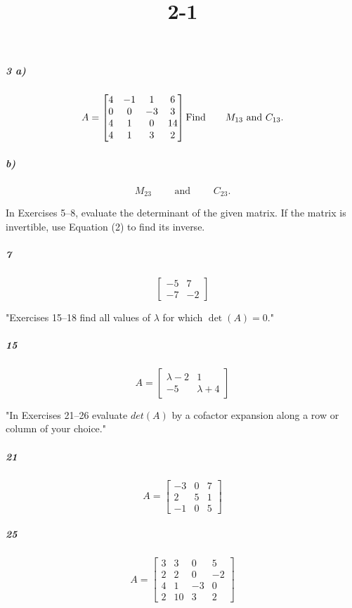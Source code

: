 \documentclass[fleqn]{article}
\title{2-1}
\begin{document}
\maketitle
\pagebreak


\subparagraph{3 a)}

\[
A = \begin{bmatrix} 4 & -1 & 1 & 6 \\ 0 & 0 & -3 & 3 \\ 4 & 1 & 0 & 14 \\ 4 & 1 & 3 & 2 \end{bmatrix}\\ \text{Find} \qquad M_{13} \text{ and } C_{13}.
\]
\vfill



\subparagraph{b)}

\[
M_{23} \qquad \text{ and } \qquad C_{23}.
\]
\vfill


\pagebreak
In Exercises 5–8, evaluate the determinant of the given matrix. If the matrix is invertible, use Equation (2) to find its inverse.

\subparagraph{7}

\[
\begin{bmatrix} -5 & 7 \\ -7 & -2 \end{bmatrix}
\]
\vfill

 "Exercises 15–18  find all values of $\lambda$ for which $\det(A) = 0$."

\subparagraph{15}

\[
A = \begin{bmatrix} \lambda - 2 & 1 \\ -5 & \lambda + 4 \end{bmatrix}
\]
\vfill


\pagebreak
 "In Exercises 21–26  evaluate $det(A)$ by a cofactor expansion along a row or column of your choice."

\subparagraph{21}

\[
A = \begin{bmatrix} -3 & 0 & 7 \\ 2 & 5 & 1 \\ -1 & 0 & 5 \end{bmatrix}
\]
\vfill



\subparagraph{25}

\[
A = \begin{bmatrix} 3 & 3 & 0 & 5 \\ 2 & 2 & 0 & -2 \\ 4 & 1 & -3 & 0 \\ 2 & 10 & 3 & 2 \end{bmatrix}
\]
\vfill
\end{document}

